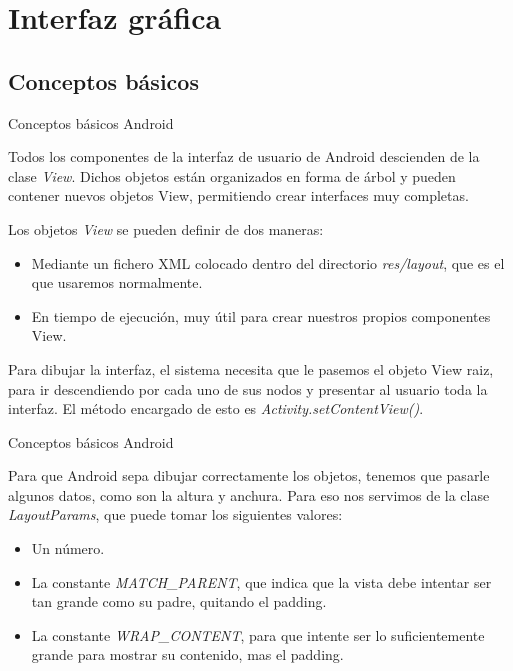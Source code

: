 \section{Interfaz gráfica}
\subsection{Conceptos básicos}
\begin{frame}{Conceptos básicos Android}
    \begin{block}{}Todos los componentes de la interfaz de usuario de Android descienden de la clase \textit{View}. Dichos objetos están organizados en forma de árbol y pueden contener nuevos objetos View, permitiendo crear interfaces muy completas.

Los objetos \textit{{View}} se pueden definir de dos maneras:
\begin{itemize}
    \item {
        Mediante un fichero XML colocado dentro del directorio \textit{{res/layout}}, que es el que usaremos normalmente.\pause
    }
    \item <2->{
        En tiempo de ejecución, muy útil para crear nuestros propios componentes View.
    }
\end{itemize}
Para dibujar la interfaz, el sistema necesita que le pasemos el objeto View raiz, para ir descendiendo por cada uno de sus nodos y presentar al usuario toda la interfaz. El método encargado de esto es \textit{{Activity.setContentView()}}.
    \end{block}
\end{frame}

\begin{frame}{Conceptos básicos Android}
    \begin{block}{}
Para que Android sepa dibujar correctamente los objetos, tenemos que pasarle algunos datos, como son la altura y anchura. Para eso nos servimos de la clase \textit{{LayoutParams}}, que puede tomar los siguientes valores:
    \begin{itemize}
    \item Un número. \pause
    \item <2-> La constante \textit{MATCH\_PARENT}, que indica que la vista debe intentar ser tan grande como su padre, quitando el padding.
    \item <3-> La constante \textit{WRAP\_CONTENT}, para que intente ser lo suficientemente grande para mostrar su contenido, mas el padding.
    \end{itemize}
    \end{block}
\end{frame}

